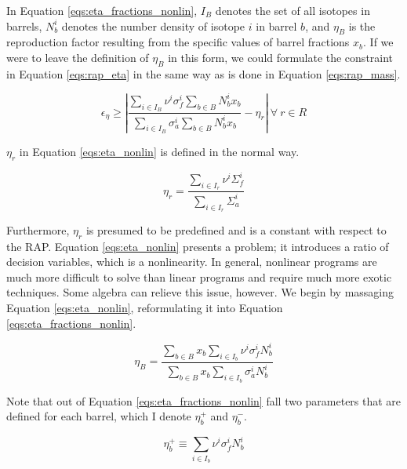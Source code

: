 In Equation \ref{eqs:eta_fractions_nonlin}, $I_{B}$ denotes the set of all
isotopes in barrels, $N_{b}^{i}$ denotes the number density of isotope $i$ in
barrel $b$, and $\eta_{B}$ is the reproduction factor resulting from the
specific values of barrel fractions $x_{b}$. If we were to leave the definition
of $\eta_{B}$ in this form, we could formulate the constraint in
Equation \ref{eqs:rap_eta} in the same way as is done in
Equation \ref{eqs:rap_mass}.

\begin{equation}
\label{eqs:eta_nonlin}
\epsilon_{\eta} \geq \left| 
\frac{\sum_{i \in I_{B}} \nu^{i} \sigma_{f}^{i} \sum_{b \in B} N_{b}^{i} x_{b}}
     {\sum_{i \in I_{B}} \sigma_{a}^{i} \sum_{b \in B} N_{b}^{i} x_{b}} 
- \eta_{r} \right|
\: \forall \: r \in R
\end{equation}

$\eta_{r}$ in Equation \ref{eqs:eta_nonlin} is defined in the normal way.

\begin{equation}
\label{eqs:eta_r}
\eta_{r} = \frac{\sum_{i \in I_{r}} \nu^{i} \Sigma_{f}^{i}}
                {\sum_{i \in I_{r}} \Sigma_{a}^{i}}
\end{equation}

Furthermore, $\eta_{r}$ is presumed to be predefined and is a constant with
respect to the RAP. Equation \ref{eqs:eta_nonlin} presents a problem; it
introduces a ratio of decision variables, which is a nonlinearity. In general,
nonlinear programs are much more difficult to solve than linear programs and
require much more exotic techniques. Some algebra can relieve this issue,
however. We begin by massaging Equation \ref{eqs:eta_nonlin}, reformulating it
into Equation \ref{eqs:eta_fractions_nonlin}.

\begin{equation}
\label{eqs:eta_fractions_lin}
\eta_{B} = \frac{\sum_{b \in B} x_{b} \sum_{i \in I_{b}} \nu^{i} \sigma_{f}^{i} N_{b}^{i}}
                {\sum_{b \in B} x_{b} \sum_{i \in I_{b}} \sigma_{a}^{i} N_{b}^{i}}
\end{equation}

Note that out of Equation \ref{eqs:eta_fractions_nonlin} fall two parameters
that are defined for each barrel, which I denote $\eta_{b}^{+}$ and
$\eta_{b}^{-}$.

\begin{equation}
\label{eqs:eta_+}
\eta_{b}^{+} \equiv \sum_{i \in I_{b}} \nu^{i} \sigma_{f}^{i} N_{b}^{i}
\end{equation}

